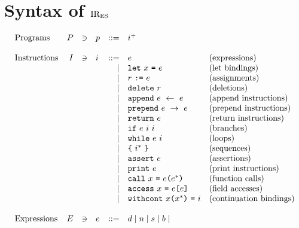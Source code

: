 \section{Syntax of \( \text{IR}_\text{ES} \)}\label{sec:syntax}

\[
  \begin{array}{lrclrll}
    \text{Programs} & \prset &\ni& \pr & ::= & \inst^+          & \text{}\\
    \\
    \text{Instructions} & \instset &\ni& \inst & ::= & \expr    & \text{(expressions)} \\
    &&&&\mid& \C{let}\ \id\ \C{=}\ \expr                        & \text{(let bindings)}\\
    &&&&\mid& \refer\ \C{:=}\ \expr                             & \text{(assignments)}\\
    &&&&\mid& \C{delete}\ \refer                                & \text{(deletions)}\\
    &&&&\mid& \C{append}\ \expr\ \leftarrow\ \expr              & \text{(append instructions)}\\
    &&&&\mid& \C{prepend}\ \expr\ \rightarrow\ \expr            & \text{(prepend instructions)}\\
    &&&&\mid& \C{return}\ \expr                                 & \text{(return instructions)}\\
    &&&&\mid& \C{if}\ \expr\ \inst\ \inst                       & \text{(branches)}\\
    &&&&\mid& \C{while}\ \expr\ \inst                           & \text{(loops)}\\
    &&&&\mid& \C{\{}\ \inst^*\ \C{\}}                           & \text{(sequences)}\\
    &&&&\mid& \C{assert}\ \expr                                 & \text{(assertions)}\\
    &&&&\mid& \C{print}\ \expr                                  & \text{(print instructions)}\\
    &&&&\mid& \C{call}\ \id\ \C{=}\ \expr \C{(} \expr^* \C{)}   & \text{(function calls)}\\
    &&&&\mid& \C{access}\ \id\ \C{=}\ \expr \C{[} \expr \C{]}   & \text{(field accesses)}\\
    &&&&\mid& \C{withcont}\ \id \C{(} \id^* \C{)}\ \C{=}\ \inst & \text{(continuation bindings)}\\
    \\
    \text{Expressions} & \exprset &\ni& \expr &
    ::= & \double \mid \intvalue \mid \str \mid \bool \mid

\end{array}\]
